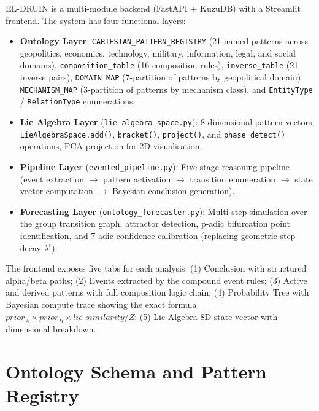 \documentclass{llncs}
\begin{document}
EL-DRUIN is a multi-module backend (FastAPI + KuzuDB) with a Streamlit
frontend. The system has four functional layers:

\begin{itemize}
\item \textbf{Ontology Layer}: \texttt{CARTESIAN\_PATTERN\_REGISTRY} (21 named
  patterns across geopolitics, economics, technology, military, information,
  legal, and social domains), \texttt{composition\_table} (16 composition rules),
  \texttt{inverse\_table} (21 inverse pairs), \texttt{DOMAIN\_MAP} (7-partition
  of patterns by geopolitical domain), \texttt{MECHANISM\_MAP} (3-partition of
  patterns by mechanism class), and \texttt{EntityType} / \texttt{RelationType} enumerations.
\item \textbf{Lie Algebra Layer} (\texttt{lie\_algebra\_space.py}): 8-dimensional
  pattern vectors, \texttt{LieAlgebraSpace.add()}, \texttt{bracket()},
  \texttt{project()}, and \texttt{phase\_detect()} operations, PCA projection
  for 2D visualisation.
\item \textbf{Pipeline Layer} (\texttt{evented\_pipeline.py}): Five-stage reasoning
  pipeline (event extraction $\to$ pattern activation $\to$ transition
  enumeration $\to$ state vector computation $\to$ Bayesian conclusion
  generation).
\item \textbf{Forecasting Layer} (\texttt{ontology\_forecaster.py}): Multi-step
  simulation over the group transition graph, attractor
  detection, p-adic bifurcation point identification, and 7-adic
  confidence calibration (replacing geometric step-decay $\lambda^t$).
\end{itemize}

The frontend exposes five tabs for each analysis: (1) Conclusion with
structured alpha/beta paths; (2) Events extracted by the compound event
rules; (3) Active and derived patterns with full composition logic
chain; (4) Probability Tree with Bayesian compute trace showing the
exact formula
$\mathit{prior}_A \times \mathit{prior}_B \times \mathit{lie\_similarity} / Z$;
(5) Lie Algebra 8D state vector with dimensional breakdown.

\section{Ontology Schema and Pattern Registry}
\end{document}
